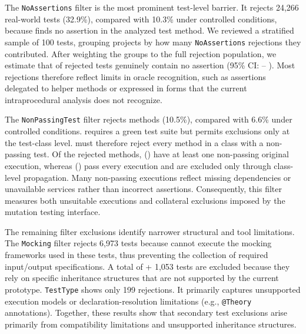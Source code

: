 The \texttt{NoAssertions} filter is the most prominent test-level barrier.
It rejects 24,266 real-world tests (32.9\%),
compared with 10.3\% under controlled conditions,
because \ToolTeralizer{} finds no assertion in the analyzed test method.
We reviewed a stratified sample of 100 tests, grouping
projects by how many \texttt{NoAssertions} rejections they contributed. After weighting the groups
to the full rejection population, we estimate that
\TzRqsixReconstructionNoAssertionsGenuineAbsenceEstimatePct{} of rejected tests genuinely contain
no assertion (95\% CI: \TzRqsixReconstructionNoAssertionsGenuineAbsenceCiLowerPct{}--
\TzRqsixReconstructionNoAssertionsGenuineAbsenceCiUpperPct{}). Most rejections therefore reflect
limits in oracle recognition, such as assertions delegated to helper methods
or expressed in forms that the current intraprocedural analysis does not recognize.

The \texttt{NonPassingTest} filter rejects \TzRealworldNonPassingRejectedTests{} methods
(10.5\%), compared with 6.6\% under controlled conditions. \ToolPit{} requires a green test suite
but permits exclusions only at the test-class level. \ToolTeralizer{} must therefore reject every
method in a class with a non-passing test. Of the rejected methods,
\TzRealworldNonPassingNonpassed{} (\TzRealworldNonPassingNonpassedPct{}) have at least one non-passing original execution, whereas
\TzRealworldNonPassingPassed{} (\TzRealworldNonPassingPassedPct{}) pass every execution and
are excluded only through class-level propagation. Many non-passing executions reflect
missing dependencies or unavailable services rather than incorrect assertions. Consequently, this
filter measures both unsuitable executions and collateral exclusions imposed by the mutation testing
interface.

The remaining filter exclusions identify narrower structural and tool limitations. The \texttt{Mocking}
filter rejects 6,973 tests because \ToolSPF{} cannot execute the mocking frameworks used in these tests,
thus preventing the collection of required input/output specifications.
A total of \TzRealworldTestFilteringInheritedMethodRejected{} + 1,053 tests are excluded
because they rely on specific inheritance structures that are not supported by the current prototype.
\texttt{TestType} shows only 199 rejections. It primarily captures unsupported execution models
or declaration-resolution limitations (e.g., \texttt{@Theory} annotations).
Together, these results show that secondary test exclusions arise primarily
from compatibility limitations and unsupported inheritance structures.

